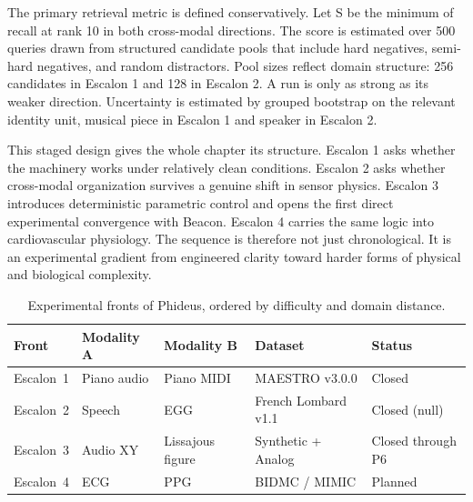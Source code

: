 The primary retrieval metric is defined conservatively. Let S be the minimum of recall at rank 10 in both cross-modal directions. The score is estimated over 500 queries drawn from structured candidate pools that include hard negatives, semi-hard negatives, and random distractors. Pool sizes reflect domain structure: 256 candidates in Escalon 1 and 128 in Escalon 2. A run is only as strong as its weaker direction. Uncertainty is estimated by grouped bootstrap on the relevant identity unit, musical piece in Escalon 1 and speaker in Escalon 2.

This staged design gives the whole chapter its structure. Escalon 1 asks whether the machinery works under relatively clean conditions. Escalon 2 asks whether cross-modal organization survives a genuine shift in sensor physics. Escalon 3 introduces deterministic parametric control and opens the first direct experimental convergence with Beacon. Escalon 4 carries the same logic into cardiovascular physiology. The sequence is therefore not just chronological. It is an experimental gradient from engineered clarity toward harder forms of physical and biological complexity.

\begin{table}[ht]
\centering
\caption{Experimental fronts of Phideus, ordered by difficulty and domain distance.}
\label{tab:phideus_fronts}
\footnotesize
\begin{tabularx}{\textwidth}{@{}lllXl@{}}
\toprule
Front & Modality A & Modality B & Dataset & Status \\
\midrule
Escalon~1 & Piano audio & Piano MIDI & MAESTRO v3.0.0 & Closed \\
Escalon~2 & Speech & EGG & French Lombard v1.1 & Closed (null) \\
Escalon~3 & Audio XY & Lissajous figure & Synthetic + Analog & Closed through P6 \\
Escalon~4 & ECG & PPG & BIDMC / MIMIC & Planned \\
\bottomrule
\end{tabularx}
\end{table}


